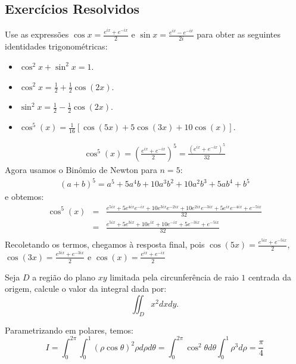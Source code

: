 \subsection*{Exercícios Resolvidos}
\begin{exeresol}Use as expressões $\cos x=\frac{e^{ix}+e^{-ix}}{2}$ e $\sin x=\frac{e^{ix}-e^{-ix}}{2i}$ para obter as seguintes identidades trigonométricas:
\begin{itemize}
\item $\cos^2x+\sin^2x=1$.
\item $\cos^2x=\frac{1}{2}+\frac{1}{2}\cos(2x)$.
\item $\sin^2x=\frac{1}{2}-\frac{1}{2}\cos(2x)$.
\item $\cos^5(x)=\frac{1}{16}\left[\cos(5x)+5\cos(3x)+10\cos(x)\right]$.
\end{itemize}
\end{exeresol}
\begin{resol}
\begin{eqnarray*}
\cos^5(x)=\left(\frac{e^{ix}+e^{-ix}}{2}\right)^5=\frac{\left({e^{ix}+e^{-ix}}\right)^5}{32}
\end{eqnarray*}
Agora usamos o Binômio de Newton para $n=5$:
\begin{eqnarray*}
(a+b)^5=a^5+5a^4b+10a^3b^2+10a^2b^3+5ab^4+b^5
\end{eqnarray*}
e obtemos:
\begin{eqnarray*}
\cos^5(x)&=&\frac{{e^{5ix}+5e^{4ix}e^{-ix}+10e^{3ix}e^{-2ix}+10e^{2ix}e^{-3ix}+5e^{ix}e^{-4ix}+e^{-5ix}}}{32}\\
&=&\frac{{e^{5ix}+5e^{3ix}+10e^{ix}+10e^{-ix}+5e^{-3ix}+e^{-5ix}}}{32}\\
\end{eqnarray*}
Recoletando os termos, chegamos à resposta final, pois $\cos(5x)=\frac{e^{5ix}+e^{-5ix}}{2}$,$\cos(3x)=\frac{e^{3ix}+e^{-3ix}}{2}$ e $\cos(x)=\frac{e^{ix}+e^{-ix}}{2}$
\end{resol}

\begin{exeresol}Seja $D$ a região do plano $xy$ limitada pela circunferência de raio $1$ centrada da origem, calcule o valor da integral dada por:
$$\iint_D x^2 dxdy.$$
\end{exeresol}
\begin{resol}Parametrizando em polares, temos:
$$I= \int_0^{2\pi}\int_0^1 (\rho\cos\theta)^2\rho d\rho d\theta=\int_{0}^{2\pi}\cos^2\theta d\theta\int_0^1\rho^3d\rho=\frac{\pi}{4}$$
\end{resol}


